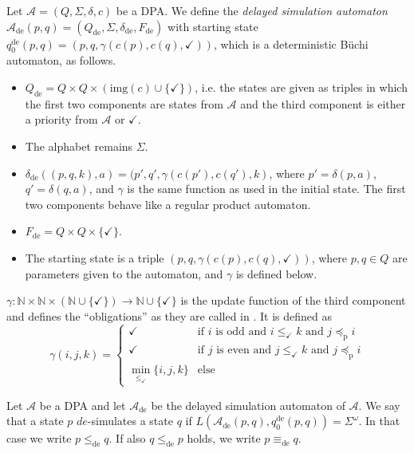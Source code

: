 \begin{defn}
	Let $\mathcal{A} = (Q, \Sigma, \delta, c)$ be a DPA. We define the \emph{delayed simulation automaton} $\mathcal{A}_\text{de}(p, q) = (Q_\text{de}, \Sigma, \delta_\text{de}, F_\text{de})$ with starting state $q_0^\text{de}(p, q) = (p, q, \gamma(c(p), c(q), \checkmark))$, which is a deterministic Büchi automaton, as follows.
	
	\begin{itemize}
		\item $Q_\text{de} = Q \times Q \times (\text{img}(c) \cup \{ \checkmark \})$, i.e. the states are given as triples in which the first two components are states from $\mathcal{A}$ and the third component is either a priority from $\mathcal{A}$ or $\checkmark$.
		\item The alphabet remains $\Sigma$.
		\item $\delta_\text{de}( (p, q, k), a ) = ( p', q', \gamma(c(p'), c(q'), k)$, where $p' = \delta(p, a)$, $q' = \delta(q, a)$, and $\gamma$ is the same function as used in the initial state. The first two components behave like a regular product automaton.
		\item $F_\text{de} = Q \times Q \times \{ \checkmark \}$.
		\item The starting state is a triple $(p, q, \gamma(c(p), c(q), \checkmark))$, where $p, q \in Q$ are parameters given to the automaton, and $\gamma$ is defined below.
	\end{itemize}
	
	$\gamma : \mathbb{N} \times \mathbb{N} \times (\mathbb{N} \cup \{\checkmark\}) \rightarrow \mathbb{N} \cup \{\checkmark\}$ is the update function of the third component and defines the \enquote{obligations} as they are called in \cite{}. It is defined as 
	$$ \gamma(i, j, k) = \begin{cases}
		\checkmark & \text{if } i \text{ is odd and } i \leq_\checkmark k \text{ and } j \preceq_\text{p} i \\
		\checkmark & \text{if } j \text{ is even and } j \leq_\checkmark k \text{ and } j \preceq_\text{p} i \\
		\min_{\leq_\checkmark} \{ i,j,k \} & \text{else}
	\end{cases} $$
\end{defn}


\begin{defn}
	Let $\mathcal{A}$ be a DPA and let $\mathcal{A}_\text{de}$ be the delayed simulation automaton of $\mathcal{A}$. We say that a state $p$ $de$-simulates a state $q$ if $L(\mathcal{A}_\text{de}(p, q), q_0^\text{de}(p, q)) = \Sigma^\omega$. In that case we write $p \leq_\text{de} q$. If also $q \leq_\text{de} p$ holds, we write $p \equiv_\text{de} q$.
\end{defn}




